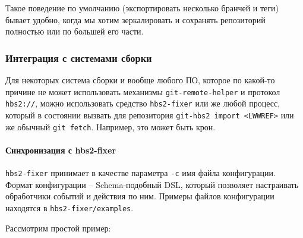 \documentclass[11pt,a4paper]{article}
\begin{document}
Такое поведение по умолчанию (экспортировать несколько бранчей и теги) бывает удобно, когда мы хотим
зеркалировать и сохранять репозиторий полностью или по большей его части.

\subsubsection{Интеграция с системами сборки}

Для некоторых система сборки и вообще любого ПО, которое по какой-то причине не может использовать
механизмы \texttt{git-remote-helper} и протокол \texttt{hbs2://}, можно использовать
средство \texttt{hbs2-fixer} или же любой процесс, который в состоянии вызвать для репозитория
\texttt{git-hbs2 import <LWWREF>} или же обычный \texttt{git fetch}. Например, это может быть крон.


\paragraph{Синхронизация с hbs2-fixer}

\texttt{hbs2-fixer} принимает в качестве параметра \texttt{-c} имя файла конфигурации.
Формат конфигурации -- Schema-подобный DSL, который позволяет настраивать обработчики
событий и действия по ним.  Примеры файлов конфигурации находятся в \texttt{hbs2-fixer/examples}.

Рассмотрим простой пример:
\end{document}
